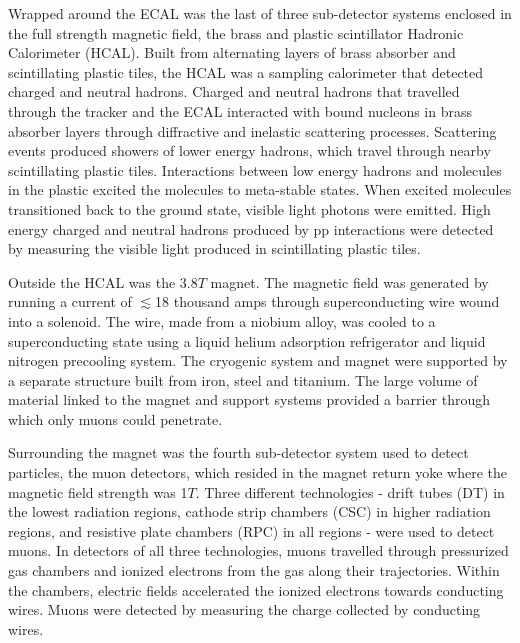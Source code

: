 Wrapped around the ECAL was the last of three sub-detector systems enclosed in the full strength magnetic field, the brass and 
plastic scintillator Hadronic Calorimeter (HCAL).  Built from alternating layers of brass absorber and scintillating
plastic tiles, the HCAL was a sampling calorimeter that detected charged and neutral hadrons.  Charged and 
neutral hadrons that travelled through the tracker and the ECAL interacted with bound nucleons in brass absorber layers
through diffractive and inelastic scattering processes.  Scattering events produced showers of lower energy hadrons, which
travel through nearby scintillating plastic tiles.  Interactions between low energy hadrons and molecules in
the plastic excited the molecules to meta-stable states.  When excited molecules transitioned back to the ground 
state, visible light photons were emitted.  High energy charged and neutral hadrons produced by pp interactions 
were detected by measuring the visible light produced in scintillating plastic tiles.

Outside the HCAL was the 3.8$\unit{T}$ magnet.  The magnetic field was generated by running a current of 
$\lesssim$18 thousand amps through superconducting wire wound into a solenoid.  The wire, made from a niobium alloy, was 
cooled to a superconducting state using a liquid helium adsorption refrigerator and liquid nitrogen precooling 
system.  The cryogenic system and magnet were supported by a separate structure built from iron, steel and titanium.  The
large volume of material linked to the magnet and support systems provided a barrier through which only muons 
could penetrate.

Surrounding the magnet was the fourth sub-detector system used to detect particles, the muon detectors, which resided 
in the magnet return yoke where the magnetic field strength was 1$\unit{T}$.  Three 
different technologies - drift tubes (DT) in the lowest radiation regions, cathode strip chambers (CSC) in higher 
radiation regions, and resistive plate chambers (RPC) in all regions - were used to detect muons.  In detectors of all 
three technologies, muons travelled through pressurized gas chambers and ionized electrons from the gas along their 
trajectories.  Within the chambers, electric fields accelerated the ionized electrons towards conducting wires.  Muons 
were detected by measuring the charge collected by conducting wires.


